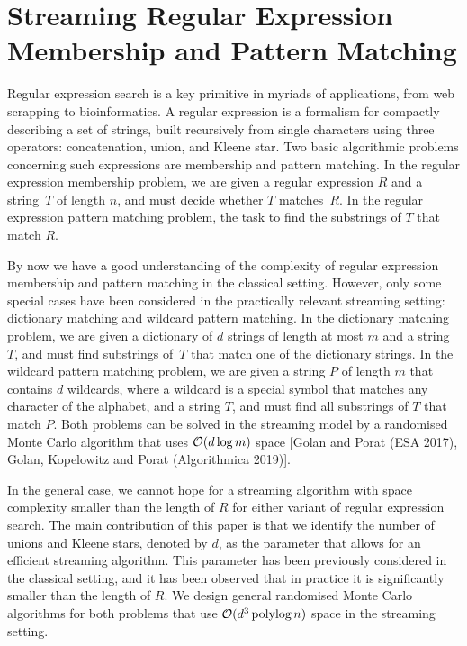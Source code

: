 \chapter{Streaming Regular Expression Membership and Pattern Matching}

\newcommand{\rot}{\mathsf{rot}}
\newcommand{\dd}{\mathinner{.\,.\allowbreak}}
\newcommand{\Ohtilda}{\tilde{O}}
\newcommand{\eps}{\varepsilon}
\newcommand{\occ}{\mathsf{occ}}
\newcommand{\Diff}{\mathsf{Diff}}
\newcommand{\Overlap}{\mathsf{Overlap}}
\newcommand{\Zp}{Z_+}


\begin{small}
\baselineskip=9pt
Regular expression search is a key primitive in myriads of applications, from web scrapping to bioinformatics.
A regular expression is a formalism for compactly describing a set of strings, built recursively from single characters
using three operators: concatenation, union, and Kleene star. Two basic algorithmic problems concerning
such expressions are membership and pattern matching.
In the regular expression membership problem, we are given a regular expression $R$ and a string~$T$ of length $n$, and must decide whether $T$ matches~$R$. In the regular expression pattern matching problem, the task to find the substrings of $T$ that match $R$. 

By now we have a good understanding of the complexity of regular expression membership and pattern matching
in the classical setting. However, only some special cases have been considered in the practically relevant streaming
setting:
dictionary matching and wildcard pattern matching. In the dictionary matching problem, we are given a dictionary of $d$ strings of
length at most $m$ and a string $T$, and must find substrings of~$T$ that match one of the dictionary strings. In the wildcard pattern
matching problem, we are given a string $P$ of length $m$ that contains $d$ wildcards, where a wildcard is a special symbol that matches
any character of the alphabet, and a string $T$, and must find all substrings of $T$ that match $P$. Both problems can be solved in the
streaming model by a randomised Monte Carlo algorithm that uses $\mathcal{O}(d \log m)$ space [Golan and Porat (ESA 2017), Golan, Kopelowitz
and Porat (Algorithmica 2019)]. 

In the general case, we cannot hope for a streaming algorithm with space complexity smaller than the length of $R$ for either variant
of regular expression search.
The main contribution of this paper is that we identify the number of unions and Kleene stars, denoted by $d$, as the parameter
that allows for an efficient streaming algorithm. This parameter has been previously considered in the classical setting, and
it has been observed that in practice it is significantly smaller than the length of $R$.
We design general randomised Monte Carlo algorithms for both problems that use $\mathcal{O}(d^3 \operatorname{polylog} n)$ space
in the streaming setting.


\end{small}
